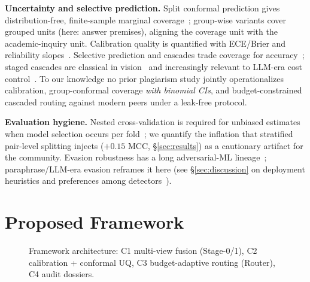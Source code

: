 \documentclass[conference]{IEEEtran}
\begin{document}
\textbf{Uncertainty and selective prediction.} Split conformal prediction gives distribution-free,
finite-sample marginal coverage~\cite{vovk2005,angelopoulos2021,romano2020}; group-wise variants
cover grouped units (here: answer premises), aligning the coverage unit with the academic-inquiry unit.
Calibration quality is quantified with ECE/Brier and reliability slopes~\cite{platt1999,zadrozny2002,guo2017}.
Selective prediction and cascades trade coverage for accuracy~\cite{chow1970,geifman2017}; staged
cascades are classical in vision~\cite{viola2001} and increasingly relevant to LLM-era cost
control~\cite{wang2017}. To our knowledge no prior plagiarism study jointly operationalizes
calibration, group-conformal coverage \emph{with binomial CIs}, and budget-constrained cascaded
routing against modern peers under a leak-free protocol.

\textbf{Evaluation hygiene.} Nested cross-validation is required for unbiased estimates when model
selection occurs per fold~\cite{varma2006}; we quantify the inflation that stratified pair-level
splitting injects ($+0.15$ MCC, \S\ref{sec:results}) as a cautionary artifact for the community.
Evasion robustness has a long adversarial-ML lineage~\cite{biggio2013,brennan2009}; paraphrase/LLM-era
evasion reframes it here (see \S\ref{sec:discussion} on deployment heuristics and preferences
among detectors~\cite{sajid2025,setu2025}).

\section{Proposed Framework}
\label{sec:method}

\begin{figure}[t]
\centering
\setlength{\fboxsep}{6pt}
\caption{Framework architecture: C1 multi-view fusion (Stage-0/1), C2 calibration + conformal UQ,
C3 budget-adaptive routing (Router), C4 audit dossiers.}
\label{fig:arch}
\end{figure}
\end{document}
